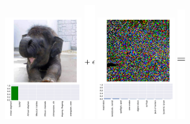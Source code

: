 \begin{figure}[H]
     \centering
     \includegraphics[width=0.30\textwidth,angle=0]{figures/protect/ori.pdf}
     \includegraphics[width=0.04\textwidth,angle=0,scale=0.9]{figures/protect/plus_epsilon.png}
     \includegraphics[width=0.30\textwidth,angle=0]{figures/protect/noise.pdf}
     \includegraphics[width=0.03\textwidth,angle=0,scale=0.9]{figures/protect/equals.png}

\end{figure}
